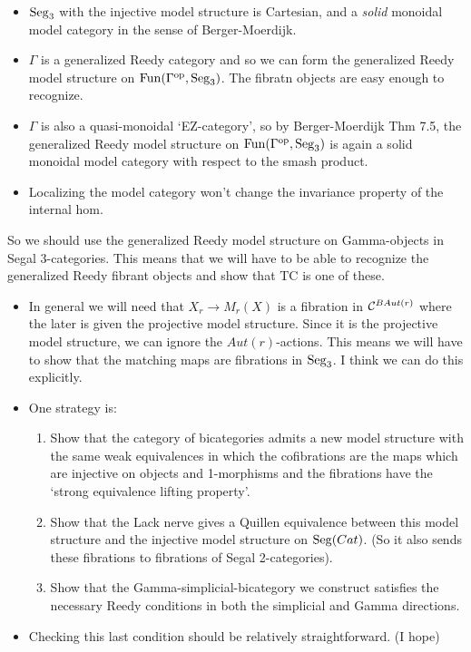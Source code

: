 \documentclass[a4paper]{amsart}
\begin{document}
\begin{itemize}
	\item $\mathrm{Seg}_3$ with the injective model structure is Cartesian, and a {\em solid} monoidal model category in the sense of Berger-Moerdijk. 
	\item $\Gamma$ is a generalized Reedy category and so we can form the generalized Reedy model structure on $\operatorname{Fun}(\Gamma^{\mathrm{op}}, \mathrm{Seg}_3)$. The fibratn objects are easy enough to recognize. 
	\item $\Gamma$ is also a quasi-monoidal `EZ-category', so by Berger-Moerdijk Thm 7.5, the generalized Reedy model structure on $\operatorname{Fun}(\Gamma^{\mathrm{op}}, \mathrm{Seg}_3)$ is again a solid monoidal model category with respect to the smash product. 
	\item Localizing the model category won't change the invariance property of the internal hom. 
\end{itemize}
So we should use the generalized Reedy model structure on Gamma-objects in Segal 3-categories. This means that we will have to be able to recognize the generalized Reedy fibrant objects and show that TC is one of these. 
\begin{itemize}
	\item In general we will need that $X_r \to M_r(X)$ is a fibration in $\mathcal C^{B Aut(r)}$ where the later is given the projective model structure. Since it is the projective model structure, we can ignore the $Aut(r)$-actions.  This means we will have to show that the matching maps are fibrations in $\mathrm{Seg}_3$. I think we can do this explicitly. 
	\item One strategy is:
	\begin{enumerate}
		\item Show that the category of bicategories admits a new model structure with the same weak equivalences in which the cofibrations are the maps which are injective on objects and 1-morphisms and the fibrations have the `strong equivalence lifting property'.
		\item Show that the Lack nerve gives a Quillen equivalence between this model structure and the injective model structure on $\mathrm{Seg}(Cat)$. (So it also sends these fibrations to fibrations of Segal 2-categories).
		\item Show that the Gamma-simplicial-bicategory we construct satisfies the necessary Reedy conditions in both the simplicial and Gamma directions. 
	\end{enumerate}
	\item Checking this last condition should be relatively straightforward. (I hope)
\end{itemize}
\end{document}
